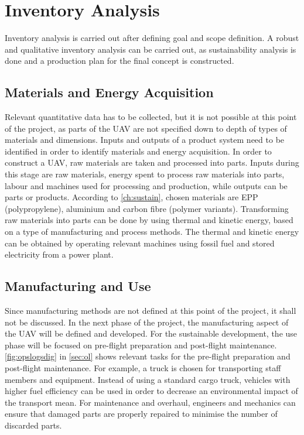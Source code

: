 \section{Inventory Analysis}
Inventory analysis is carried out after defining goal and scope definition. A robust and qualitative inventory analysis can be carried out, as sustainability analysis is done and a production plan for the final concept is constructed.

\subsection{Materials and Energy Acquisition}
Relevant quantitative data has to be collected, but it is not possible at this point of the project, as parts of the UAV are not specified down to depth of types of materials and dimensions. Inputs and outputs of a product system need to be identified in order to identify materials and energy acquisition. In order to construct a UAV, raw materials are taken and processed into parts. Inputs during this stage are raw materials, energy spent to process raw materials into parts, labour and machines used for processing and production, while outputs can be parts or products. According to \autoref{ch:sustain}, chosen materials are EPP (polypropylene), aluminium and carbon fibre (polymer variants). Transforming raw materials into parts can be done by using thermal and kinetic energy, based on a type of manufacturing and process methods. The thermal and kinetic energy can be obtained by operating relevant machines using fossil fuel and stored electricity from a power plant.

\subsection{Manufacturing and Use}
Since manufacturing methods are not defined at this point of the project, it shall not be discussed. In the next phase of the project, the manufacturing aspect of the UAV will be defined and developed. For the sustainable development, the use phase will be focused on pre-flight preparation and post-flight maintenance. \autoref{fig:opslogsdig} in \autoref{sec:ol} shows relevant tasks for the pre-flight preparation and post-flight maintenance. For example, a truck is chosen for transporting staff members and equipment. Instead of using a standard cargo truck, vehicles with higher fuel efficiency can be used in order to decrease an environmental impact of the transport mean. For maintenance and overhaul, engineers and mechanics can ensure that damaged parts are properly repaired to minimise the number of discarded parts.

